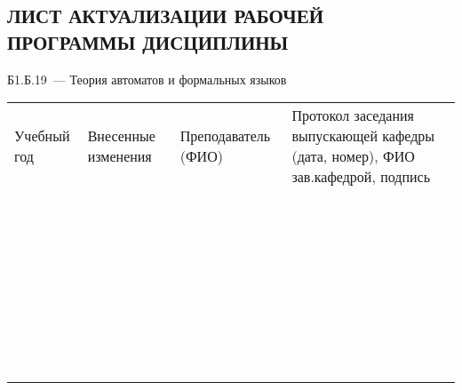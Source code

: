 \documentclass[a4paper,12pt]{article}
\begin{document}
\newpage
\begin{center}
\section*{ЛИСТ АКТУАЛИЗАЦИИ РАБОЧЕЙ ПРОГРАММЫ ДИСЦИПЛИНЫ}
Б1.Б.19\ --- Теория автоматов и формальных языков 
\end{center}

  \noindent
  \begin{tabular}{|p{15mm}|p{67mm}|p{25mm}|p{41mm}|}
    \hline
    \small\centering
    Учебный год 
    & \small\centering
    Внесенные изменения 
    & \small\centering
    Преподаватель (ФИО) 
    & \small\centering\arraybackslash
    Протокол заседания выпускающей кафедры (дата, номер), ФИО зав.кафедрой, подпись \\
    & & & \\\hline
    & & & \\\hline
    & & & \\\hline
    & & & \\\hline
    & & & \\\hline
    & & & \\\hline
    & & & \\\hline
    & & & \\\hline
    & & & \\\hline
    & & & \\\hline
    & & & \\\hline
    & & & \\\hline
    & & & \\\hline
    & & & \\\hline
    & & & \\\hline
    & & & \\\hline
    & & & \\\hline
    & & & \\\hline
    & & & \\\hline
    & & & \\\hline
    & & & \\\hline
    & & & \\\hline
    & & & \\\hline
    & & & \\\hline
    & & & \\\hline
    & & & \\\hline
    & & & \\\hline
    & & & \\\hline
    & & & \\\hline
    & & & \\\hline
    & & & \\\hline
    & & & \\\hline
    & & & \\\hline
    & & & \\\hline
    & & & \\\hline
    & & & \\\hline
  \end{tabular}
\end{document}
